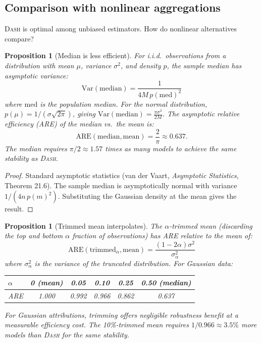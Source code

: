 \documentclass{article}
\newcommand{\Var}{\mathrm{Var}}
\newcommand{\DASH}{\textsc{Dash}}
\newtheorem{proposition}[theorem]{Proposition}
\begin{document}
\subsection{Comparison with nonlinear aggregations}

\DASH{} is optimal among unbiased estimators. How do nonlinear
alternatives compare?

\begin{proposition}[Median is less efficient]
\label{prop:median}
For i.i.d.\ observations from a distribution with mean $\mu$,
variance $\sigma^2$, and density $p$, the sample median has
asymptotic variance:
\[
    \Var(\text{median}) = \frac{1}{4M\, p(\text{med})^2}
\]
where $\text{med}$ is the population median.
For the normal distribution, $p(\mu) = 1/(\sigma\sqrt{2\pi})$,
giving $\Var(\text{median}) = \frac{\pi\sigma^2}{2M}$.
The asymptotic relative efficiency (ARE) of the median vs.\
the mean is:
\[
    \text{ARE}(\text{median}, \text{mean}) = \frac{2}{\pi} \approx 0.637.
\]
The median requires $\pi/2 \approx 1.57$ times as many models to
achieve the same stability as \DASH{}.
\end{proposition}

\begin{proof}
Standard asymptotic statistics (van der Vaart, \emph{Asymptotic
Statistics}, Theorem 21.6). The sample median is asymptotically
normal with variance $1/(4n\,p(m)^2)$. Substituting the Gaussian
density at the mean gives the result.
\end{proof}

\begin{proposition}[Trimmed mean interpolates]
\label{prop:trimmed}
The $\alpha$-trimmed mean (discarding the top and bottom $\alpha$
fraction of observations) has ARE relative to the mean of:
\[
    \text{ARE}(\text{trimmed}_\alpha, \text{mean}) =
    \frac{(1-2\alpha)\sigma^2}{\sigma^2_\alpha}
\]
where $\sigma^2_\alpha$ is the variance of the truncated distribution.
For Gaussian data:
\begin{center}
\small
\begin{tabular}{@{}lccccc@{}}
\toprule
$\alpha$ & 0 (mean) & 0.05 & 0.10 & 0.25 & 0.50 (median) \\
\midrule
ARE & 1.000 & 0.992 & 0.966 & 0.862 & 0.637 \\
\bottomrule
\end{tabular}
\end{center}
For Gaussian attributions, trimming offers negligible robustness
benefit at a measurable efficiency cost. The 10\%-trimmed mean
requires $1/0.966 \approx 3.5\%$ more models than \DASH{} for the
same stability.
\end{proposition}
\end{document}

